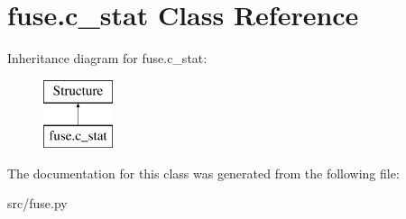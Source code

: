 \hypertarget{classfuse_1_1c__stat}{\section{fuse.\-c\-\_\-stat Class Reference}
\label{classfuse_1_1c__stat}
}
Inheritance diagram for fuse.\-c\-\_\-stat\-:\begin{figure}[H]
\begin{center}
\leavevmode
\includegraphics[height=2.000000cm]{classfuse_1_1c__stat}
\end{center}
\end{figure}


The documentation for this class was generated from the following file\-:\begin{DoxyCompactItemize}
\item 
src/fuse.\-py\end{DoxyCompactItemize}
